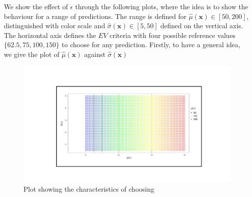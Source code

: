 We show the effect of $\epsilon$ through the following plots, where the idea is to show the behaviour for a range of predictions. The range is defined for  $\hat{\mu} {(\bm x)} \in [50,200]$, distinguished with color scale and $\hat{\sigma} {(\bm x)} \in [5,50]$ defined on the vertical axis. The horizontal axis defines the $EV$ criteria with four possible reference values $\{ 62.5,75,100,150\}$ to choose for any prediction. Firstly, to have a general idea, we give the plot of $\hat{\mu} {(\bm x)}$ against $\hat{\sigma} {(\bm x)}$

\begin{figure}[h!]
    \centering
    \includegraphics[scale=0.3]{Chapter5/Pictures/EV_mean}
    \caption{Plot showing the characteristics of choosing }
    \label{fig:EV_1.5}
\end{figure}





